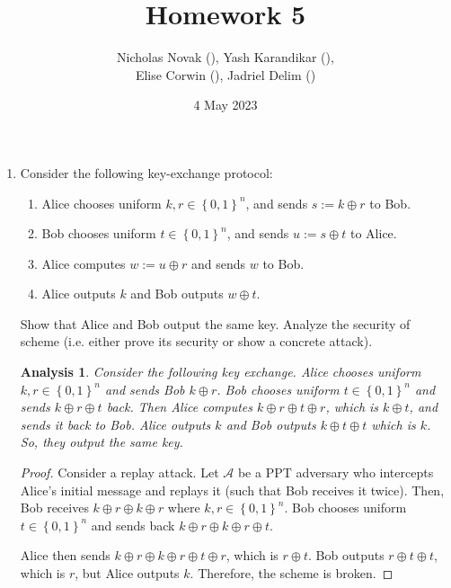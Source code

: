 \documentclass{article}
\title{Homework 5}
\date{4 May 2023}
\author{Nicholas Novak (), Yash Karandikar (),\\
Elise Corwin (), Jadriel Delim ()}
\newtheorem{analysis}{Analysis}
\begin{document}
\maketitle

\begin{enumerate}
  \item Consider the following key-exchange protocol:
    \begin{enumerate}
      \item Alice chooses uniform $k, r \in \left\{0, 1\right\}^n$, and sends $s
        := k \oplus r$ to Bob.
      \item Bob chooses uniform $t \in \left\{0, 1\right\}^n$, and sends $u :=
        s \oplus t$ to Alice.
      \item Alice computes $w := u \oplus r$ and sends $w$ to Bob.
      \item Alice outputs $k$ and Bob outputs $w \oplus t$.
    \end{enumerate}

    Show that Alice and Bob output the same key. Analyze the security of
    scheme (i.e. either prove its security or show a concrete attack).

    \begin{analysis}
      Consider the following key exchange. Alice chooses uniform $k, r \in
      \left\{0, 1\right\}^n$ and sends Bob $k \oplus r$. Bob chooses uniform $t
      \in \left\{0, 1\right\}^n$ and sends $k \oplus r \oplus t$ back. Then
      Alice computes $k \oplus r \oplus t \oplus r$, which is $k \oplus t$, and
      sends it back to Bob. Alice outputs $k$ and Bob outputs $k \oplus t \oplus
      t$ which is $k$. So, they output the same key.
    \end{analysis}

    \begin{proof}
      Consider a replay attack. Let $\mathcal{A}$ be a PPT adversary who
      intercepts Alice's initial message and replays it (such that Bob receives
      it twice). Then, Bob receives $k \oplus r \oplus k \oplus r$ where $k, r
      \in \left\{0, 1\right\}^n$. Bob chooses uniform $t \in \left\{0,
      1\right\}^n$ and sends back $k \oplus r \oplus k \oplus r \oplus t$.

      Alice then sends $k \oplus r \oplus k \oplus r \oplus t \oplus r$, which
      is $r \oplus t$. Bob outputs $r \oplus t \oplus t$, which is $r$, but
      Alice outputs $k$. Therefore, the scheme is broken.
    \end{proof}


\end{enumerate}
\end{document}
